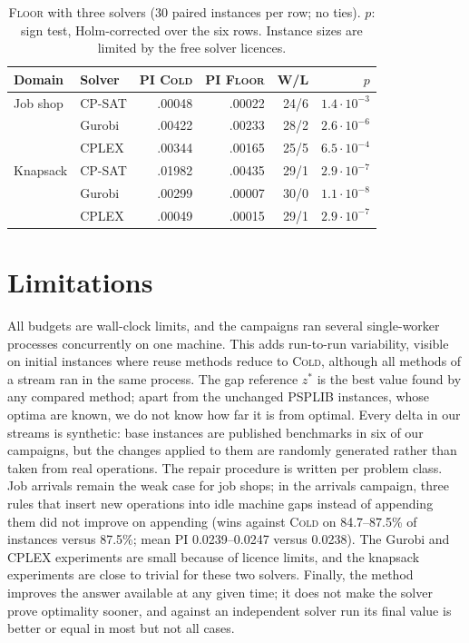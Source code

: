 \documentclass[letterpaper]{article} %
\newcommand{\mcold}{\textsc{Cold}}
\newcommand{\mfloor}{\textsc{Floor}}
\begin{document}
\begin{table}[t]
\centering
\small
\setlength{\tabcolsep}{3.5pt}
\begin{tabular}{llrrrr}
\toprule
Domain & Solver & PI \mcold & PI \mfloor & W/L & $p$ \\
\midrule
Job shop & CP-SAT & .00048 & .00022 & 24/6 & $1.4\cdot10^{-3}$ \\
 & Gurobi & .00422 & .00233 & 28/2 & $2.6\cdot10^{-6}$ \\
 & CPLEX & .00344 & .00165 & 25/5 & $6.5\cdot10^{-4}$ \\
Knapsack & CP-SAT & .01982 & .00435 & 29/1 & $2.9\cdot10^{-7}$ \\
 & Gurobi & .00299 & .00007 & 30/0 & $1.1\cdot10^{-8}$ \\
 & CPLEX & .00049 & .00015 & 29/1 & $2.9\cdot10^{-7}$ \\
\bottomrule
\end{tabular}
\caption{\mfloor{} with three solvers (30 paired instances per row; no ties). $p$: sign test, Holm-corrected over the six rows. Instance sizes are limited by the free solver licences.}
\label{tab:solvers}
\end{table}

\section{Limitations}

All budgets are wall-clock limits, and the campaigns ran several single-worker processes concurrently on one machine. This adds run-to-run variability, visible on initial instances where reuse methods reduce to \mcold, although all methods of a stream ran in the same process. The gap reference $z^*$ is the best value found by any compared method; apart from the unchanged PSPLIB instances, whose optima are known, we do not know how far it is from optimal. Every delta in our streams is synthetic: base instances are published benchmarks in six of our campaigns, but the changes applied to them are randomly generated rather than taken from real operations. The repair procedure is written per problem class. Job arrivals remain the weak case for job shops; in the arrivals campaign, three rules that insert new operations into idle machine gaps instead of appending them did not improve on appending (wins against \mcold{} on 84.7--87.5\% of instances versus 87.5\%; mean PI 0.0239--0.0247 versus 0.0238). The Gurobi and CPLEX experiments are small because of licence limits, and the knapsack experiments are close to trivial for these two solvers. Finally, the method improves the answer available at any given time; it does not make the solver prove optimality sooner, and against an independent solver run its final value is better or equal in most but not all cases.
\end{document}
